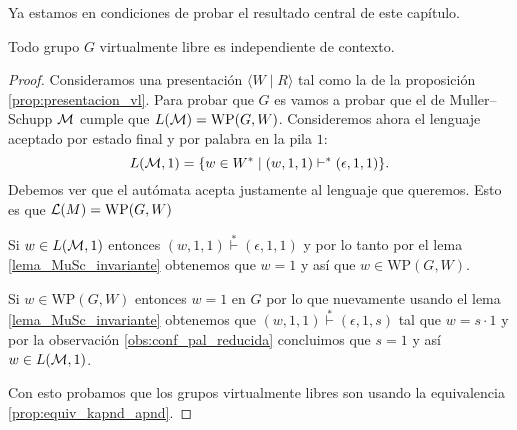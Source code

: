 \documentclass[tesis.tex]{subfiles}
\begin{document}
	Ya estamos en condiciones de probar el resultado central de este capítulo.

\begin{teo}\label{teo_Muller_Schupp}\cite{muller1983groups}
	Todo grupo $G$ virtualmente libre es independiente de contexto.
\end{teo}

\begin{proof}
	Consideramos una presentación $\langle W \mid R \rangle$ tal como la de la proposición \ref{prop:presentacion_vl}.
	Para probar que $G$ es \ic vamos a probar que el \APD de Muller--Schupp $\cal M$ cumple que $L({\cal M})= \text{WP}(G,W)$.
	Consideremos ahora el lenguaje aceptado por estado final y por palabra en la pila $1$:
	\[
	{L }({\cal M}, 1) = \{  w \in W^* \mid (w,1,1)   \vdash^*  (\epsilon, 1, 1)  \}.
	\]
	Debemos ver que el autómata acepta justamente al lenguaje que queremos. 
	Esto es que $ {\cal L }(M) = \text{WP}(G,W) $ 
	
	Si $w \in L({\cal M},1)$ entonces $(w, 1, 1) \overset{*}{\vdash} (\epsilon, 1, 1)$ y por lo tanto por el lema \ref{lema_MuSc_invariante} obtenemos que $w = 1$ y así que $w \in \text{WP}(G,W)$.
	
	Si $w \in \text{WP}(G,W)$ entonces $w = 1$ en $G$ por lo que nuevamente usando el lema \ref{lema_MuSc_invariante} obtenemos que $(w, 1, 1) \overset{*}{\vdash} (\epsilon, 1, s)$
	tal que $w = s \cdot 1$ y por la observación \ref{obs:conf_pal_reducida} concluimos que $s = 1$ y así $w \in L({\cal M},1)$.
	
	
	Con esto probamos que los grupos virtualmente libres son \ic usando la equivalencia \ref{prop:equiv_kapnd_apnd}.
	
\end{proof}



	
\end{document}
